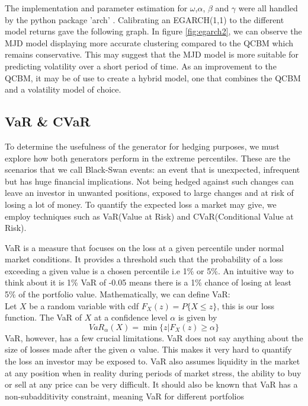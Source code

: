 \documentclass[12pt]{article}
\newcommand{\newp}
    {
    \vskip 0.5cm 
  }
\numberwithin{equation}{section}
\begin{document}
The implementation and parameter estimation for $\omega$,$\alpha$, $\beta$ and 
$\gamma$ were all handled by 
the python package 'arch' \autocite{arch}. 
Calibrating an EGARCH(1,1) to the different model returns gave the following graph. 
In figure \ref{fig:egarch2}, we can observe the MJD model displaying more accurate 
clustering compared to the QCBM which remains conservative. This may suggest that 
the MJD model is more suitable for predicting volatility over a short period of 
time. As an improvement to the QCBM, it may be of use to create a hybrid model, 
one that combines the QCBM and a volatility model of choice. 

\newpage
\subsection{VaR \& CVaR}
To determine the usefulness of the generator for hedging purposes, we must explore 
how both generators perform in the extreme percentiles. These are the scenarios 
that we call Black-Swan events: an event that is unexpected, infrequent but has 
huge financial implications. Not being hedged against such changes can leave an 
investor in unwanted positions, exposed to large changes and at risk of losing 
a lot of money. To quantify the expected loss a market may give, we employ techniques 
such as VaR(Value at Risk) and CVaR(Conditional Value at Risk). 
\newp 
VaR is a measure that focuses on the loss at a given percentile under normal 
market conditions. It provides a threshold such that the probability of a loss 
exceeding a given value is a chosen percentile i.e 1\% or 5\%. An intuitive 
way to think about it is 1\% VaR of -0.05 means there is a 1\% chance of 
losing at least 5\% of the portfolio value. Mathematically, we can define VaR:\\ 
Let $X$ be a random variable with cdf $F_{X}(z)=P\{X\leq z\}$, this is our loss function. 
The VaR of $X$ at a confidence level $\alpha$ is given by
\begin{equation}
  VaR_\alpha(X) = \min\{z|F_X(z)\geq \alpha\}
\end{equation}
VaR, however, has a few crucial limitations. VaR does not say anything about the 
size of losses made after the given $\alpha$ value. This makes it very hard to 
quantify the loss an investor may be exposed to. VaR also assumes liquidity in 
the market at any position when in reality during periods of market stress, the 
ability to buy or sell at any price can be very difficult. It should also be 
known that VaR has a non-subadditivity constraint, meaning VaR for different portfolios 
\end{document}

